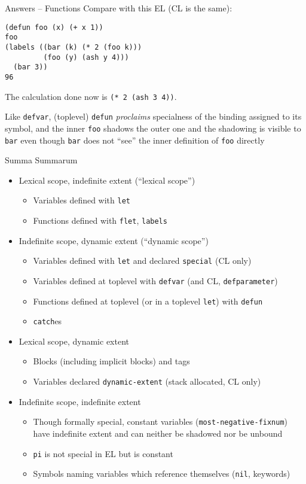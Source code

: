 \documentclass[presentation]{beamer}
\begin{document}
\begin{frame}[fragile]{Answers -- Functions}
Compare with this EL (CL is the same):
\begin{verbatim}
(defun foo (x) (+ x 1))
foo
(labels ((bar (k) (* 2 (foo k)))
         (foo (y) (ash y 4)))
  (bar 3))
96
\end{verbatim}
The calculation done now is \texttt{(* 2 (ash 3 4))}.

\smallskip\noindent Like \texttt{defvar}, (toplevel) \texttt{defun} \emph{proclaims} specialness of the binding assigned to its symbol, and the inner \texttt{foo} shadows the outer one and the shadowing is visible to \texttt{bar} even though \texttt{bar} does not ``see'' the inner definition of \texttt{foo} directly

\end{frame}

\begin{frame}{Summa Summarum}
  \begin{itemize}
  \item Lexical scope, indefinite extent (``lexical scope'')
    \begin{itemize}
    \item Variables defined with \texttt{let}
    \item Functions defined with \texttt{flet}, \texttt{labels}
    \end{itemize}
  \item Indefinite scope, dynamic extent (``dynamic scope'')
    \begin{itemize}
    \item Variables defined with \texttt{let} and declared \texttt{special} (CL only)
    \item Variables defined at toplevel with \texttt{defvar} (and CL, \texttt{defparameter})
    \item Functions defined at toplevel (or in a toplevel \texttt{let}) with \texttt{defun}
    \item \texttt{catch}es
    \end{itemize}
  \item Lexical scope, dynamic extent
    \begin{itemize}
    \item Blocks (including implicit blocks) and tags
    \item Variables declared \texttt{dynamic-extent} (stack allocated, CL only)
    \end{itemize}
  \item Indefinite scope, indefinite extent
    \begin{itemize}
    \item Though formally special, constant variables (\texttt{most-negative-fixnum}) have indefinite extent and can neither be shadowed nor be unbound
    \item \texttt{pi} is not special in EL but is constant
    \item Symbols naming variables which reference themselves (\texttt{nil}, keywords)
    \end{itemize}
  \end{itemize}
\end{frame}
\end{document}

